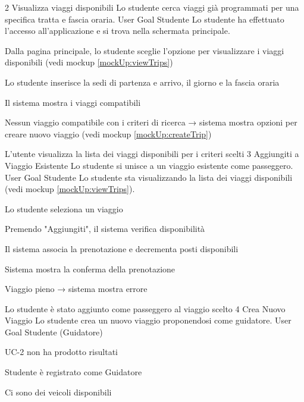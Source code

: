 \UseCase
{2}
{Visualizza viaggi disponibili}
{Lo studente cerca viaggi già programmati per una specifica tratta e fascia oraria.}
{User Goal}
{Studente}
{Lo studente ha effettuato l’accesso all’applicazione e si trova nella schermata principale.}
{\begin{description}[nosep]
    \item[1.] Dalla pagina principale, lo studente sceglie l'opzione per visualizzare i viaggi disponibili (vedi mockup \ref{mockUp:viewTrips})
    \item[2.] Lo studente inserisce la sedi di partenza e arrivo, il giorno e la fascia oraria
    \item[3.] Il sistema mostra i viaggi compatibili
\end{description}}
{\begin{description}[nosep]
    \item[3a.] Nessun viaggio compatibile con i criteri di ricerca → sistema mostra opzioni per creare nuovo viaggio (vedi mockup \ref{mockUp:createTrip})
\end{description}}
{L'utente visualizza la lista dei viaggi disponibili per i criteri scelti} 
\UseCase
{3}
{Aggiungiti a Viaggio Esistente}
{Lo studente si unisce a un viaggio esistente come passeggero.}
{User Goal}
{Studente}
{Lo studente sta visualizzando la lista dei viaggi disponibili (vedi mockup \ref{mockUp:viewTrips}).}
{\begin{description}[nosep]
    \item[1.] Lo studente seleziona un viaggio
    \item[2.] Premendo "Aggiungiti", il sistema verifica disponibilità
    \item[3.] Il sistema associa la prenotazione e decrementa posti disponibili
    \item[4.] Sistema mostra la conferma della prenotazione
\end{description}}
{\begin{description}[nosep]
    \item[2a.] Viaggio pieno → sistema mostra errore
\end{description}}
{Lo studente è stato aggiunto come passeggero al viaggio scelto}
\label{uc:uc3}
\UseCase
{4}
{Crea Nuovo Viaggio}
{Lo studente crea un nuovo viaggio proponendosi come guidatore.}
{User Goal}
{Studente (Guidatore)}
{\begin{description}[nosep]
    \item[-] UC-2 non ha prodotto risultati
    \item[-] Studente è registrato come Guidatore
    \item[-] Ci sono dei veicoli disponibili
\end{description}}
